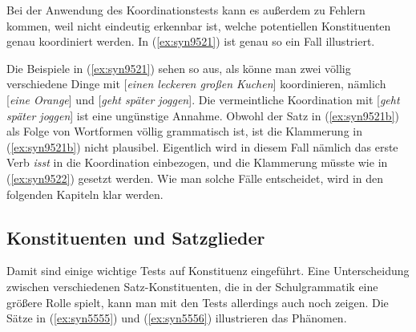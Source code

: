 Bei der Anwendung des Koordinationstests kann es außerdem zu Fehlern kommen, weil nicht eindeutig erkennbar ist, welche potentiellen Konstituenten genau koordiniert werden.
In (\ref{ex:syn9521}) ist genau so ein Fall illustriert.

\begin{exe}
  \begin{xlist}
  \end{xlist}
\end{exe}

Die Beispiele in (\ref{ex:syn9521}) sehen so aus, als könne man zwei völlig verschiedene Dinge mit [\textit{einen leckeren großen Kuchen}] koordinieren, nämlich [\textit{eine Orange}] und [\textit{geht später joggen}].
Die vermeintliche Koordination mit [\textit{geht später joggen}] ist eine ungünstige Annahme.
Obwohl der Satz in (\ref{ex:syn9521b}) als Folge von Wortformen völlig grammatisch ist, ist die Klammerung in (\ref{ex:syn9521b}) nicht plausibel.
Eigentlich wird in diesem Fall nämlich das erste Verb \textit{isst} in die Koordination einbezogen, und die Klammerung müsste wie in (\ref{ex:syn9522}) gesetzt werden.
Wie man solche Fälle entscheidet, wird in den folgenden Kapiteln klar werden.

\begin{exe}
\end{exe}

\subsection{Konstituenten und Satzglieder}

\label{sec:satzglied}

Damit sind einige wichtige Tests auf Konstituenz eingeführt.
Eine Unterscheidung zwischen verschiedenen Satz-Konstituenten, die in der Schulgrammatik eine größere Rolle spielt, kann man mit den Tests allerdings auch noch zeigen.
Die Sätze in (\ref{ex:syn5555}) und (\ref{ex:syn5556}) illustrieren das Phänomen.

